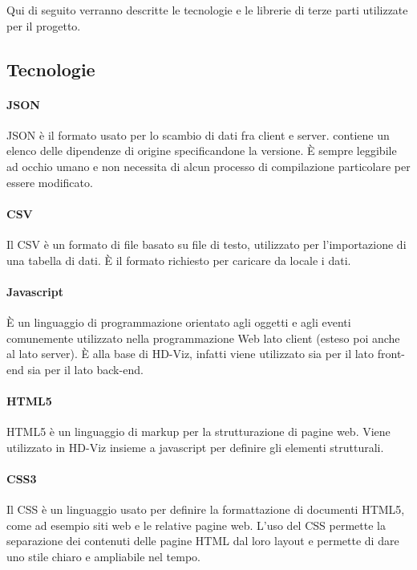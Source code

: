 \documentclass[../manuale_sviluppatore.tex]{subfiles}
\begin{document}
Qui di seguito verranno descritte le tecnologie e le librerie di terze parti utilizzate per il progetto.


\subsection{Tecnologie}

\paragraph{JSON}
JSON è il formato usato per lo scambio di dati fra client e server. contiene un elenco delle dipendenze di origine specificandone la versione. 
È sempre leggibile ad occhio umano e non necessita di alcun processo di compilazione particolare per essere modificato. 

\paragraph{CSV}
Il CSV è un formato di file basato su file di testo, utilizzato
per l’importazione di una tabella di dati.  È il formato richiesto per caricare da locale i dati.

\paragraph{Javascript}
È un linguaggio di programmazione orientato agli oggetti e agli eventi comunemente utilizzato nella programmazione Web lato client (esteso poi anche al lato server). 
È alla base di HD-Viz, infatti viene utilizzato sia per il lato front-end sia per il lato back-end. 

\paragraph{HTML5}
HTML5 è un linguaggio di markup per la strutturazione di pagine web. Viene utilizzato
in HD-Viz insieme a javascript per definire gli elementi strutturali.

\paragraph{CSS3}
Il CSS è un linguaggio usato per definire la formattazione di documenti HTML5, come ad esempio siti web e le relative pagine web. 
L’uso del CSS permette la separazione dei contenuti delle pagine HTML dal loro layout e permette di dare uno stile chiaro e ampliabile nel tempo. 
\end{document}
